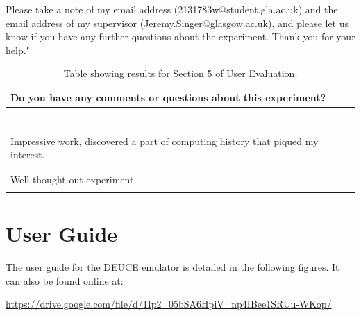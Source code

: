 \documentclass{l4proj}
\begin{document}
\begin{appendices}
Please take a note of my email address (2131783w@student.gla.ac.uk) and the email address of my supervisor (Jeremy.Singer@glasgow.ac.uk), and please let us know if you have any further questions about the experiment. Thank you for your help."

\begin{table}[h]
	\caption{Table showing results for Section 5 of User Evaluation.}
	\label{tab:section-5}
	\begin{tabular}{|l|}
		\hline
		Do you have any comments or questions about this experiment? \\ \hline
		\\ \hline
		\\ \hline
		\\ \hline
		\\ \hline
		\\ \hline
		\\ \hline
		\\ \hline
		Impressive work, discovered a part of computing history that piqued my interest. \\ \hline
		\\ \hline
		\\ \hline
		Well thought out experiment \\ \hline
		\\ \hline
	\end{tabular}
\end{table}

\chapter{User Guide}
The user guide for the DEUCE emulator is detailed in the following figures. It can also be found online at:

\url{https://drive.google.com/file/d/1Ip2_05bSA6HpiV_np4IBee1SRUu-WKop/}




\end{appendices}
\end{document}
